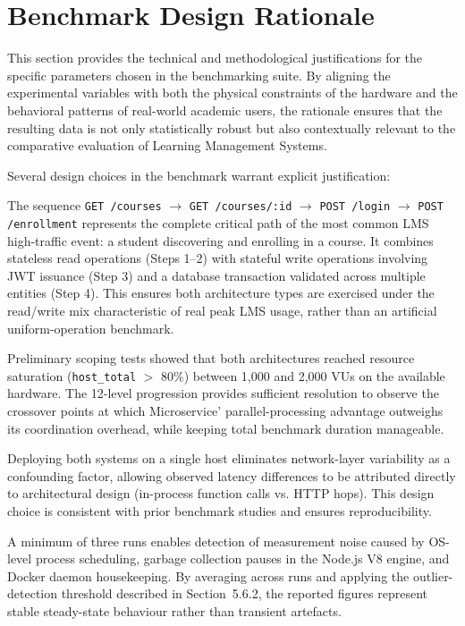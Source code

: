 \section{Benchmark Design Rationale}
This section provides the technical and methodological justifications for the specific parameters chosen in the benchmarking suite. By aligning the experimental variables with both the physical constraints of the hardware and the behavioral patterns of real-world academic users, the rationale ensures that the resulting data is not only statistically robust but also contextually relevant to the comparative evaluation of Learning Management Systems.

Several design choices in the benchmark warrant explicit justification:

\begin{description}[style=nextline]
    \item[Why these four API endpoints?] 
    The sequence \texttt{GET /courses} $\rightarrow$ \texttt{GET /courses/:id} $\rightarrow$ \texttt{POST /login} $\rightarrow$ \texttt{POST /enrollment} 
    represents the complete critical path of the most common LMS high-traffic event: a student discovering and enrolling in a course. 
    It combines stateless read operations (Steps 1–2) with stateful write operations involving JWT issuance (Step 3) and a database transaction validated across multiple entities (Step 4). 
    This ensures both architecture types are exercised under the read/write mix characteristic of real peak LMS usage, rather than an artificial uniform-operation benchmark.

    \item[Why 12 VU levels up to 2,000?] 
    Preliminary scoping tests showed that both architectures reached resource saturation (\texttt{host\_total} $>$ 80\%) between 1,000 and 2,000 VUs on the available hardware. 
    The 12-level progression provides sufficient resolution to observe the crossover points at which Microservice' parallel-processing advantage outweighs its coordination overhead, while keeping total benchmark duration manageable.

    \item[Why localhost deployment?] 
    Deploying both systems on a single host eliminates network-layer variability as a confounding factor, allowing observed latency differences to be attributed directly to architectural design (in-process function calls vs. HTTP hops). 
    This design choice is consistent with prior benchmark studies \cite{AlDebagy2018,Schloegl2024} and ensures reproducibility.

    \item[Why three runs per scenario?] 
    A minimum of three runs enables detection of measurement noise caused by OS-level process scheduling, garbage collection pauses in the Node.js V8 engine, and Docker daemon housekeeping. 
    By averaging across runs and applying the outlier-detection threshold described in Section~5.6.2, the reported figures represent stable steady-state behaviour rather than transient artefacts.
\end{description}

